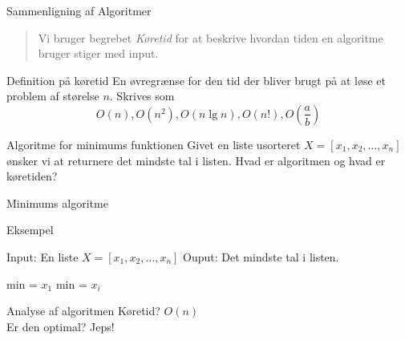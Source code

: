 \documentclass[12pt,t]{beamer}
\begin{document}
    \begin{frame}[t]{Sammenligning af Algoritmer}
        \vspace{-1em}
        \begin{quote}
            Vi bruger begrebet \emph{Køretid} for at beskrive hvordan tiden en
            algoritme bruger stiger med input.
        \end{quote}
        \pause
        \vspace{-1em}
        \begin{block}{Definition på køretid}
            En øvregrænse for den tid der bliver brugt på at løse et problem af
            størelse $n$. Skrives som
            $$
                O(n), O(n^2), O(n \lg n), O(n!), O\left( \frac{a}{b} \right)
            $$
        \end{block}
        \pause
        \begin{exampleblock}{Algoritme for minimums funktionen}
            Givet en liste usorteret $X = [x_1,x_2,\dots,x_n]$ ønsker vi at returnere det
            mindste tal i listen. Hvad er algoritmen og hvad er køretiden?
        \end{exampleblock}
    \end{frame}

    \begin{frame}{Minimums algoritme}
        \begin{block}{Eksempel}
        \vspace{-1.5em}
        \begin{algorithm}[H]
            \caption{\newline Input: En liste $X=[x_1,x_2, \dots, x_n]$
                     \newline Ouput: Det mindste tal i listen.
            }
            \begin{algorithmic}
                \State min = $x_1$
                        \State min = $x_i$
                    \EndIf
                \EndFor
            \end{algorithmic}
        \end{algorithm}
        \end{block}
        \pause
        \begin{block}{Analyse af algoritmen}
            \centering Køretid? \pause $O(n)$ \\
            \pause
            \centering Er den optimal? \pause \alert{Jeps!}
        \end{block}
    \end{frame}
\end{document}

